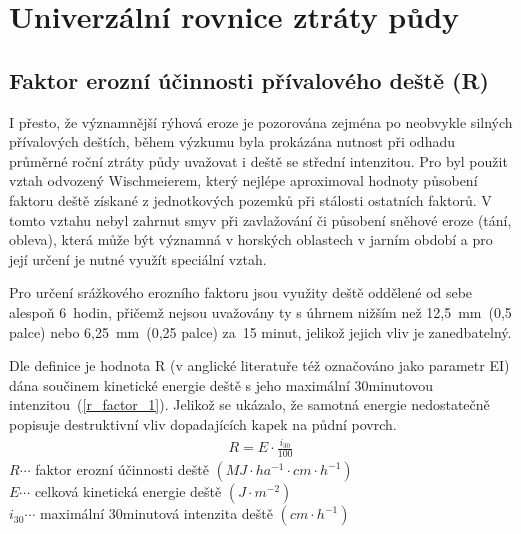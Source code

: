 \section{Univerzální rovnice ztráty půdy}
\subsection{Faktor erozní účinnosti přívalového deště (R)}
I přesto, že významnější rýhová eroze je pozorována zejména po
neobvykle silných přívalových deštích, během výzkumu byla prokázána
nutnost při odhadu průměrné roční ztráty půdy uvažovat i deště se
střední intenzitou. Pro  byl použit vztah odvozený
Wischmeierem\cite{Wischmeier1959}, který nejlépe aproximoval hodnoty
působení faktoru deště získané z jednotkových pozemků při stálosti
ostatních faktorů. V tomto vztahu nebyl zahrnut smyv při zavlažování
či působení sněhové eroze (tání, obleva), která může být významná v
horských oblastech v jarním období a pro její určení je nutné využít
speciální vztah.

Pro určení srážkového erozního faktoru jsou využity deště oddělené od
sebe alespoň 6~hodin, přičemž nejsou uvažovány ty s úhrnem nižším než
12,5~mm~(0,5 palce) nebo 6,25~mm~(0,25 palce) za~15 minut, jelikož
jejich vliv je zanedbatelný.

Dle definice je hodnota R (v anglické literatuře též označováno jako
parametr EI) dána součinem kinetické energie deště s jeho maximální
30minutovou intenzitou~(\ref{r_factor_1}). Jelikož se ukázalo, že
samotná energie nedostatečně popisuje destruktivní vliv dopadajících
kapek na půdní povrch.\cite{usle1978}
\begin{align}
   \label{r_factor_1} R=E\cdot  \frac{i_{30}}{100}
\end{align}
\hspace*{2cm}$R \cdots$ faktor erozní účinnosti deště $\left( MJ\cdot
ha^{-1}\cdot cm \cdot h^{-1} \right)$\\
\hspace*{2cm}$E \cdots$ celková kinetická energie deště $\left( J\cdot
m^{-2} \right)$\\
\hspace*{2cm}$i_{30} \cdots$ maximální 30minutová intenzita deště
$\left( cm\cdot h^{-1} \right)$\\

